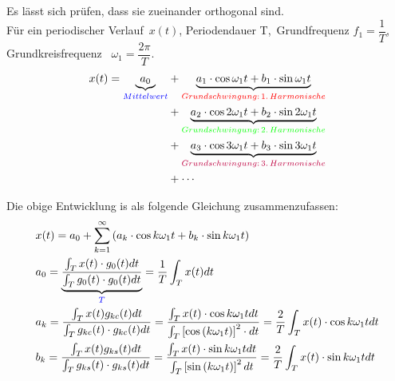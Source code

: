 Es lässt sich prüfen, dass sie zueinander orthogonal sind.\\
Für ein periodischer Verlauf \,$x(t)$, Periodendauer T, \,Grundfrequenz $f_1=\dfrac{1}{T}$, Grundkreisfrequenz \, $\omega_1=\dfrac{2\pi}{T}$.
\begin{equation}
\begin{aligned}
    x(t)=\underbrace{a_{0}}_{\textcolor{blue}{Mittelwert}} &+\underbrace{a_{1} \cdot \cos \omega_{1} t+b_{1} \cdot \sin \omega_{1} t }_{\textcolor{red}{Grundschwingung:\, 1.\, Harmonische}}\\
               &+\underbrace{a_{2} \cdot \cos 2\omega_{1} t+b_{2} \cdot \sin 2\omega_{1} t }_{\textcolor{green}{Grundschwingung: \,2.\, Harmonische}}\\
               &+\underbrace{a_{3} \cdot \cos 3\omega_{1} t+b_{3} \cdot \sin 3\omega_{1} t }_{\textcolor{purple}{Grundschwingung:\, 3.\, Harmonische}}\\
               &+\cdots
\end{aligned}
\nonumber
\end{equation}

Die obige Entwicklung is als folgende Gleichung zusammenzufassen:\\
\begin{equation}
\begin{aligned}
    &x(t)=a_{0}+\sum_{k=1}^{\infty}\left(a_{k} \cdot \cos k \omega_{1} t+b_{k} \cdot \sin k \omega_{1} t\right) \\
    &a_{0}=\underbrace{\frac{\int_{T} x(t) \cdot g_{0}(t) d t}{\int_{T} g_{0}(t) \cdot g_{0}(t) d t}}_{\textcolor{blue}{T}}=\frac{1}{T} \int_{T} x(t) d t \\
    &a_{k}=\frac{\int_{T} x(t) g_{k c}(t) d t}{\int_{T} g_{k c}(t) \cdot g_{k c}(t) d t}=\frac{\int_{T} x(t) \cdot \cos k \omega_{1} t d t}{\int_{T}\left[\cos \left(k \omega_{1} t\right)\right]^{2} \cdot d t}=\frac{2}{T} \int_{T} x(t) \cdot \cos k \omega_{1} t d t \\
    &b_{k}=\frac{\int_{T} x(t) g_{k s}(t) d t}{\int_{T} g_{k s}(t) \cdot g_{k s}(t) d t}=\frac{\int_{T} x(t) \cdot \sin k \omega_{1} t d t}{\int_{T}\left[\sin \left(k \omega_{1} t\right)\right]^{2} d t}=\frac{2}{T} \int_{T} x(t) \cdot \sin k \omega_{1} t d t
    \end{aligned}
   \label{con:Gl zur Berechnung FR}
\end{equation}

